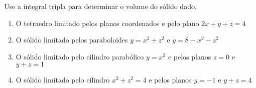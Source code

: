 \documentclass[a4paper, 12pt]{article}
\begin{document}
	\vspace{5mm}
	
	Use a integral tripla para determinar o volume do sólido dado.
	
	\begin{enumerate}[resume]
	
		\item O tetraedro limitado pelos planos coordenados e pelo plano $2x + y + z = 4$
		
		\item O sólido limitado pelos paraboloides $y = x^2 + z^2$ e $y = 8 - x^2 - z^2$
		\resposta{$16\pi$}
		
		\item O sólido limitado pelo cilindro parabólico $y = x^2$ e pelos planos $z = 0$ e $y + z = 1$
		
		\item O sólido limitado pelo cilindro $x^2 + z^2 = 4$ e pelos planos $y = -1$ e $y + z = 4$
		\resposta{$20\pi$}
	
	\end{enumerate}
			
	\vspace{5mm}	
	
\end{document}
